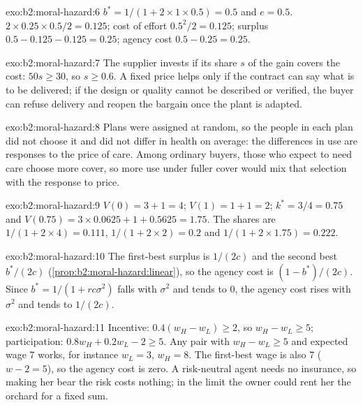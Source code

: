 \begin{solution}{exo:b2:moral-hazard:6}
$b^* = 1/(1 + 2 \times 1 \times 0.5) = 0.5$ and $e = 0.5$.  $2 \times 0.25 \times 0.5/2 = 0.125$; cost of effort $0.5^2/2 = 0.125$; surplus
$0.5 - 0.125 - 0.125 = 0.25$; agency cost $0.5 - 0.25 = 0.25$.
\end{solution}

\begin{solution}{exo:b2:moral-hazard:7}
The supplier invests if its share $s$ of the gain covers the cost: $50s \ge 30$, so $s \ge 0.6$. A fixed price helps only if the
contract can say what is to be delivered; if the design or quality cannot be described or verified, the buyer can refuse
delivery and reopen the bargain once the plant is adapted.
\end{solution}

\begin{solution}{exo:b2:moral-hazard:8}
Plans were assigned at random, so the people in each plan did not choose it and did not differ in health on average: the
differences in use are responses to the price of care. Among ordinary buyers, those who expect to need care choose more
cover, so more use under fuller cover would mix that selection with the response to price.
\end{solution}

\begin{solution}{exo:b2:moral-hazard:9}
$V(0) = 3 + 1 = 4$; $V(1) = 1 + 1 = 2$; $k^* = 3/4 = 0.75$ and $V(0.75) = 3 \times 0.0625 + 1 + 0.5625 = 1.75$. The shares are $1/(1 + 2 \times 4) = 0.111$,
$1/(1 + 2 \times 2) = 0.2$ and $1/(1 + 2 \times 1.75) = 0.222$.
\end{solution}

\begin{solution}{exo:b2:moral-hazard:10}
The first-best surplus is $1/(2c)$ and the second best $b^*/(2c)$ (\cref{prop:b2:moral-hazard:linear}), so the agency cost is $(1 - b^*)/(2c)$.
Since $b^* = 1/(1 + rc\sigma^2)$ falls with $\sigma^2$ and tends to 0, the agency cost rises with $\sigma^2$ and tends to $1/(2c)$.
\end{solution}

\begin{solution}{exo:b2:moral-hazard:11}
Incentive: $0.4(w_H - w_L) \ge 2$, so $w_H - w_L \ge 5$; participation: $0.8w_H + 0.2w_L - 2 \ge 5$. Any pair with $w_H - w_L \ge 5$ and expected wage 7
works, for instance $w_L = 3$, $w_H = 8$. The first-best wage is also 7 ($w - 2 = 5$), so the agency cost is zero. A risk-neutral agent needs
no insurance, so making her bear the risk costs nothing; in the limit the owner could rent her the orchard for a fixed sum.
\end{solution}

